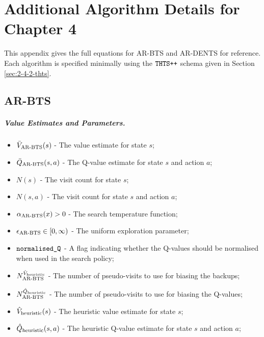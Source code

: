 










\chapter{\label{app:4:algo-ref}Additional Algorithm Details for Chapter 4}

    \minitoc

    This appendix gives the full equations for AR-BTS and AR-DENTS for reference. Each algorithm is specified minimally using the ${\textnormal{\texttt{THTS++}}}$ schema given in Section \ref{sec:2-4-2-thts}.






\section{AR-BTS}
\label{appsec:4:ar-bts-ref}

    \paragraph{Value Estimates and Parameters.}
    
        \begin{itemize}
            \item ${\bar{V}_{{\textnormal{AR-BTS}}}}(s)$ - The value estimate for state $s$;
            \item ${\bar{Q}_{{\textnormal{AR-BTS}}}}(s,a)$ - The Q-value estimate for state $s$ and action $a$;
            \item $N(s)$ - The visit count for state $s$;
            \item $N(s,a)$ - The visit count for state $s$ and action $a$;
            \item ${\alpha_{{\textnormal{AR-BTS}}}}(x)>0$ - The search temperature function;
            \item ${\epsilon_{{\textnormal{AR-BTS}}}} \in [0,\infty)$ - The uniform exploration parameter;
            \item ${\textnormal{\texttt{normalised\_Q}}}$ - A flag indicating whether the Q-values should be normalised when used in the search policy;
            \item $N^{{\hat{V}_{\textnormal{heuristic}}}}_{{\textnormal{AR-BTS}}}$ - The number of pseudo-visits to use for biasing the backups;
            \item $N^{{\hat{Q}_{\textnormal{heuristic}}}}_{{\textnormal{AR-BTS}}}$ - The number of pseudo-visits to use for biasing the Q-values;
            \item ${\hat{V}_{\textnormal{heuristic}}}(s)$ - The heuristic value estimate for state $s$;
            \item ${\hat{Q}_{\textnormal{heuristic}}}(s,a)$ - The heuristic Q-value estimate for state $s$ and action $a$;
        \end{itemize}

